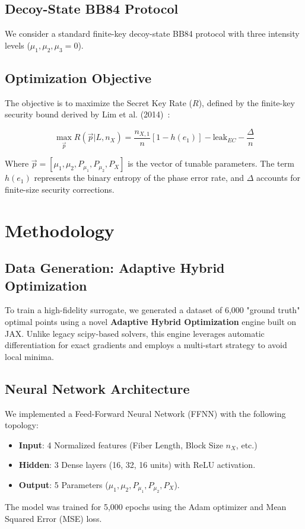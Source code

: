 \documentclass[11pt,a4paper]{article}
\begin{document}
\subsection{Decoy-State BB84 Protocol}
We consider a standard finite-key decoy-state BB84 protocol with three intensity levels ($\mu_1, \mu_2, \mu_3=0$).

\subsection{Optimization Objective}
The objective is to maximize the Secret Key Rate ($R$), defined by the finite-key security bound derived by Lim et al. (2014)~\cite{lim2014}:

\begin{equation}
\max_{\vec{p}} R(\vec{p} | L, n_X) = \frac{n_{X,1}}{n} [1 - h(e_1)] - \text{leak}_{EC} - \frac{\Delta}{n}
\end{equation}

Where $\vec{p} = [\mu_1, \mu_2, P_{\mu_1}, P_{\mu_2}, P_X]$ is the vector of tunable parameters. The term $h(e_1)$ represents the binary entropy of the phase error rate, and $\Delta$ accounts for finite-size security corrections.

\section{Methodology}

\subsection{Data Generation: Adaptive Hybrid Optimization}
To train a high-fidelity surrogate, we generated a dataset of 6,000 "ground truth" optimal points using a novel \textbf{Adaptive Hybrid Optimization} engine built on JAX. Unlike legacy scipy-based solvers, this engine leverages automatic differentiation for exact gradients and employs a multi-start strategy to avoid local minima.

\subsection{Neural Network Architecture}
We implemented a Feed-Forward Neural Network (FFNN) with the following topology:
\begin{itemize}
    \item \textbf{Input}: 4 Normalized features (Fiber Length, Block Size $n_X$, etc.)
    \item \textbf{Hidden}: 3 Dense layers (16, 32, 16 units) with ReLU activation.
    \item \textbf{Output}: 5 Parameters ($\mu_1, \mu_2, P_{\mu_1}, P_{\mu_2}, P_X$).
\end{itemize}
The model was trained for 5,000 epochs using the Adam optimizer and Mean Squared Error (MSE) loss.
\end{document}
